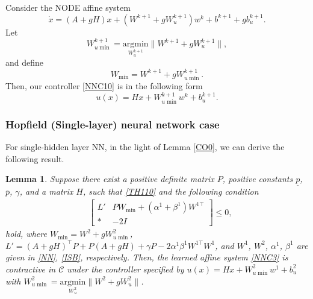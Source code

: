 \documentclass[journal,twoside,web]{ieeecolor}
\newtheorem{lemma}              [theorem]{Lemma}
\begin{document}
Consider the NODE affine system
\begin{equation}\label{NNC3}
  \dot{x}=(A+gH)x+(W^{k+1}+gW_u^{k+1})w^k+b^{k+1}+gb_u^{k+1}.
\end{equation}
Let 
\begin{equation}\label{NNC4}
W_{u\min}^{k+1}=\underset{W_u^{k+1}}{\text{argmin}} \|W^{k+1}+gW_u^{k+1}\|,
\end{equation} 
and define 
\begin{equation}\label{NNC5}
W_{\min}=W^{k+1}+gW_{u\min}^{k+1}. 
\end{equation}
Then, our controller \eqref{NNC10} is in the following form
\begin{equation}\label{NNC11}
u(x)=Hx+W_{u\min}^{k+1}w^k+b_u^{k+1}.
\end{equation}
\subsubsection{‌‌Hopfield (Single-layer) neural network case} 
For single-hidden layer NN, in the light of Lemma \ref{CO0}, we can derive the following result.
\begin{lemma}\label{corollary2}
Suppose there exist a positive definite matrix $P$, positive constants $\underline{p}$, $\overline{p}$, $\gamma$, and a matrix $H$, such that \eqref{TH110} and the following condition 
\begin{equation}\label{CO22}
\begin{aligned}
&\begin{bmatrix}
L'&PW_{\min}+(\alpha^1+\beta^1)W^{1\top}\\
\ast & -2I
\end{bmatrix}\leq 0,
\end{aligned}
\end{equation}
hold, where $W_{\min}=W^2+gW_{u\min}^{2}$, $L'=(A+gH)^\top P+P(A+gH)+\gamma P-2\alpha^1\beta^1W^{1\top}W^1$, and $W^1$, $W^2$, $\alpha^1$, $\beta^1$ are given in \eqref{NN}, \eqref{ISB}, respectively. Then, the learned affine system \eqref{NNC3} is contractive in $\mathcal{C}$ under the controller specified by $u(x)=Hx+W_{u\min}^{2}w^1+b_u^{2}$ with $W_{u\min}^{2}=\underset{W_u^{2}}{\text{argmin}} \|W^{2}+gW_u^{2}\|$.
\end{lemma} 
\end{document}
